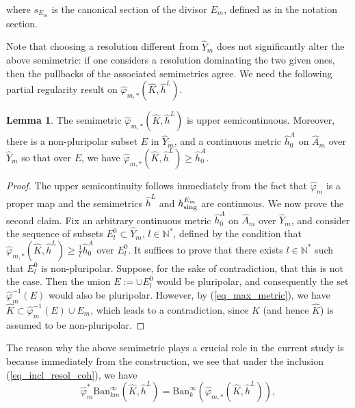 \documentclass[12pt]{article}
\numberwithin{equation}{section}
\theoremstyle{theorem}
\theoremstyle{definition}
\newtheorem{lem}[thm]{Lemma}
\theoremstyle{remark}
\newcommand{\nat}{\mathbb{N}}
\begin{document}
	where $s_{E_m}$ is the canonical section of the divisor $E_m$, defined as in the notation section.
	\par 
	Note that choosing a resolution different from $\widehat{Y}_m$ does not significantly alter the above semimetric: if one considers a resolution dominating the two given ones, then the pullbacks of the associated semimetrics agree.
	We need the following partial regularity result on $\widehat{\varphi}_{m, *} (\widehat{K}, \widehat{h}^L)$.
	\begin{lem}\label{lem_bnd_below_mettr}
		The semimetric $\widehat{\varphi}_{m, *} (\widehat{K}, \widehat{h}^L)$ is upper semicontinuous.
		Moreover, there is a non-pluripolar subset $E$ in $\widehat{Y}_m$, and a continuous metric $\widehat{h}^A_0$ on $\widehat{A}_m$ over $\widehat{Y}_m$ so that over $E$, we have $\widehat{\varphi}_{m, *} (\widehat{K}, \widehat{h}^L) \geq \widehat{h}^A_0$.
	\end{lem}
	\begin{proof}
		The upper semicontinuity follows immediately from the fact that $\widehat{\varphi}_{m}$ is a proper map and the semimetrics $\widehat{h}^L$ and $h^{E_m}_{{\rm{sing}}}$ are continuous.
		We now prove the second claim.
		Fix an arbitrary continuous metric $\widehat{h}^A_0$ on $\widehat{A}_m$ over $\widehat{Y}_m$, and consider the sequence of subsets $E^0_l \subset \widehat{Y}_m$, $l \in \nat^*$, defined by the condition that $\widehat{\varphi}_{m, *} (\widehat{K}, \widehat{h}^L) \geq \frac{1}{l} \widehat{h}^A_0$ over $E^0_l$.
		It suffices to prove that there exists $l \in \nat^*$ such that $E^0_l$ is non-pluripolar.
		Suppose, for the sake of contradiction, that this is not the case.
		Then the union $E := \cup E^0_l$ would be pluripolar, and consequently the set $\widehat{\varphi}_m^{-1}(E)$ would also be pluripolar.
		However, by (\ref{eq_max_metric}), we have $\widehat{K} \subset \widehat{\varphi}_m^{-1}(E) \cup E_m$, which leads to a contradiction, since $K$ (and hence $\widehat{K}$) is assumed to be non-pluripolar.
	\end{proof}
	\par 
	The reason why the above semimetric plays a crucial role in the current study is because immediately from the construction, we see that under the inclusion (\ref{eq_incl_resol_coh}), we have
	\begin{equation}\label{eq_kod_pullback_sup}
		 \widehat{\varphi}_m^* \textrm{Ban}_{km}^{\infty}(\widehat{K}, \widehat{h}^L)
		 =
		 \textrm{Ban}_{k}^{\infty}(\widehat{\varphi}_{m, *} (\widehat{K}, \widehat{h}^L)),
	\end{equation}
\end{document}
